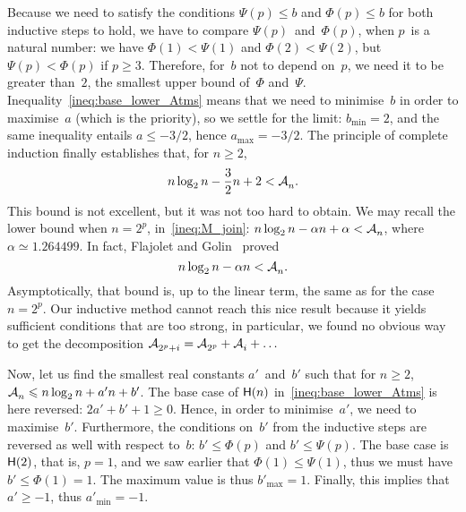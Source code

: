 Because we need to satisfy the conditions \(\Psi(p) \leqslant b\) and
\(\Phi(p) \leqslant b\) for both inductive steps to hold, we have to
compare \(\Psi(p)\)~and~\(\Phi(p)\), when \(p\)~is a natural number:
we have \(\Phi(1) < \Psi(1)\) and \(\Phi(2) < \Psi(2)\), but \(\Psi(p)
< \Phi(p)\) if \(p \geqslant 3\). Therefore, for~\(b\) not to depend
on~\(p\), we need it to be greater than~\(2\), the smallest upper
bound of~\(\Phi\)
and~\(\Psi\). Inequality~\eqref{ineq:base_lower_Atms} means that we
need to minimise~\(b\) in order to maximise~\(a\) (which is the
priority), so we settle for the limit: \(b_{\min} = 2\), and the same
inequality entails \(a \leqslant -3/2\), hence \(a_{\max} =
-3/2\). The principle of complete induction finally establishes that,
for \(n \geqslant 2\),
\begin{equation}
  n\log_2 n - \frac{3}{2} n + 2 < \mathcal{A}_{n}^{}.
\label{ineq:lower_Atms}
\end{equation}
This bound is not excellent, but it was not too hard to obtain. We may
recall the lower bound when \(n=2^p\), in~\eqref{ineq:M_join}: \(n\log_2
n - \alpha n + \alpha < \mathcal{A}_{n}^{}\), where \(\alpha \simeq
1.264499\). In fact, Flajolet and Golin~\cite{FlajoletGolin:1994}
proved
\begin{equation}
n\log_2 n - \alpha n < \mathcal{A}_{n}^{}.
\label{ineq:best_lower_Atms}
\end{equation}
Asymptotically, that bound is, up to the linear term, the same as for
the case \(n=2^p\). Our inductive method cannot reach this nice result
because it yields sufficient conditions that are too strong, in
particular, we found no obvious way to get the decomposition
\(\mathcal{A}_{2^p+i}^{} = \mathcal{A}_{2^p}^{} + \mathcal{A}_{i}^{} + \dots\)

Now, let us find the smallest real constants \(a'\)~and~\(b'\) such
that for \(n \geqslant 2\), \(\mathcal{A}_{n}^{} \leqslant n\log_2 n + a'n +
b'\). The base case of \(\textsf{H}({n})\) in~\eqref{ineq:base_lower_Atms}
is here reversed: \(2a' + b' + 1 \geqslant 0\). Hence, in order to
minimise~\(a'\), we need to maximise~\(b'\). Furthermore, the
conditions on~\(b'\) from the inductive steps are reversed as well
with respect to~\(b\): \(b' \leqslant \Phi(p)\) and \(b' \leqslant
\Psi(p)\). The base case is \(\textsf{H}({2})\), that is, \(p=1\), and we
saw earlier that \(\Phi(1) \leqslant \Psi(1)\), thus we must have
\(b'\leqslant \Phi(1) = 1\). The maximum value is thus \(b'_{\max} =
1\). Finally, this implies that \(a'\geqslant -1\), thus \(a'_{\min} =
-1\).

